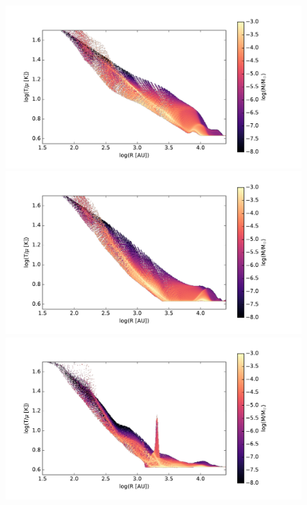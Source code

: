 
\begin{figure}[!htb]
 \centering
 \includegraphics[width=0.99\textwidth]{Figures/var_rt_larson_plots/temp_R_hist_n100c01}
 \includegraphics[width=0.99\textwidth]{Figures/var_rt_larson_plots/temp_R_hist_n10c01}
 \includegraphics[width=0.99\textwidth]{Figures/var_rt_larson_plots/temp_R_hist_n1c01}

\end{figure}
